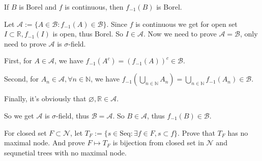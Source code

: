 \documentclass{ctexart}
\begin{document}
\begin{problem}
  If \(B\) is Borel and \(f\) is continuous, then \(f_{-1}(B)\) is Borel. 
\end{problem}

\begin{solution}
  Let \(\mathcal{A}:=\{A \in \mathcal{B}:f_{-1}(A) \in \mathcal{B}\}\). 
  Since \(f\) is continuous we get for open set \(I \subset \mathbb{R}, f_{-1}(I)\) is open, thus Borel. 
  So \(I \in \mathcal{A}\). Now we need to prove \(\mathcal{A}=\mathcal{B}\), only need to prove \(\mathcal{A}\) is \(\sigma\)-field. 
  
  First, for \(A \in \mathcal{A}\), we have \(f_{-1}(A^{c})=(f_{-1}(A))^{c} \in \mathcal{B}\). 

  Second, for \(A_n \in \mathcal{A}, \forall n \in \mathbb{N}\), we have \(f_{-1}(\bigcup_{n \in \mathbb{N}} A_n)=\bigcup_{n \in \mathbb{N}} f_{-1}(A_n) \in \mathcal{B}\). 

  Finally, it's obviously that \(\varnothing,\mathbb{R} \in \mathcal{A}\). 

  So we get \(\mathcal{A}\) is \(\sigma\)-field, thus \(\mathcal{B}=\mathcal{A}\). 
  So \(B \in \mathcal{A}\), thus \(f_{-1}(B) \in \mathcal{B}\). 
\end{solution}

\begin{problem}
  For closed set \(F \subset \mathcal{N}\), let \(T_F:=\{s \in \mathrm{Seq}:\exists f \in F,s \subset f\}\). 
  Prove that \(T_F\) has no maximal node. And prove \(F \mapsto T_F\) is bijection from closed set in \(\mathcal{N}\) and sequnetial trees with no maximal node. 
\end{problem}
\end{document}
